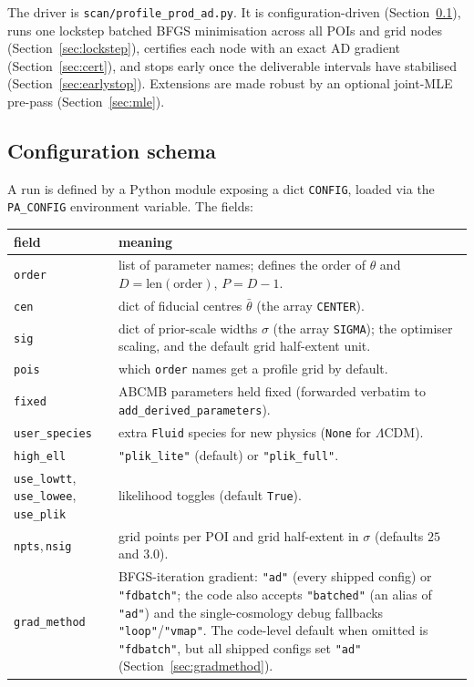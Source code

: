 \documentclass[11pt]{article}
\newcommand{\code}[1]{\texttt{\small #1}}
\newcommand{\file}[1]{\texttt{\small #1}}
\begin{document}
The driver is \file{scan/profile\_prod\_ad.py}. It is configuration-driven
(Section~\ref{sec:config}), runs one lockstep batched BFGS minimisation
across all POIs and grid nodes (Section~\ref{sec:lockstep}), certifies
each node with an exact AD gradient (Section~\ref{sec:cert}), and stops
early once the deliverable intervals have stabilised
(Section~\ref{sec:earlystop}). Extensions are made robust by an optional
joint-MLE pre-pass (Section~\ref{sec:mle}).

\subsection{Configuration schema}
\label{sec:config}

A run is defined by a Python module exposing a dict \code{CONFIG}, loaded
via the \code{PA\_CONFIG} environment variable. The fields:
\begin{longtable}{p{}p{}}
\toprule
field & meaning \\
\midrule
\endhead
\code{order} & list of parameter names; defines the order of $\theta$ and
$D=\mathrm{len(order)}$, $P=D-1$. \\
\code{cen} & dict of fiducial centres $\bar\theta$ (the array
\code{CENTER}). \\
\code{sig} & dict of prior-scale widths $\sigma$ (the array \code{SIGMA});
the optimiser scaling, and the default grid half-extent unit. \\
\code{pois} & which \code{order} names get a profile grid by default. \\
\code{fixed} & \textsc{ABCMB} parameters held fixed (forwarded verbatim to
\code{add\_derived\_parameters}). \\
\code{user\_species} & extra \code{Fluid} species for new physics
(\code{None} for $\Lambda$CDM). \\
\code{high\_ell} & \code{"plik\_lite"} (default) or \code{"plik\_full"}. \\
\code{use\_lowtt}, \code{use\_lowee}, \code{use\_plik} & likelihood
toggles (default \code{True}). \\
\code{npts},\,\code{nsig} & grid points per POI and grid half-extent in
$\sigma$ (defaults $25$ and $3.0$). \\
\code{grad\_method} & BFGS-iteration gradient: \code{"ad"} (every shipped
config) or \code{"fdbatch"}; the code also accepts \code{"batched"} (an
alias of \code{"ad"}) and the single-cosmology debug fallbacks
\code{"loop"}/\code{"vmap"}. The code-level default when omitted is
\code{"fdbatch"}, but all shipped configs set \code{"ad"}
(Section~\ref{sec:gradmethod}). \\
\bottomrule
\end{longtable}
\end{document}
